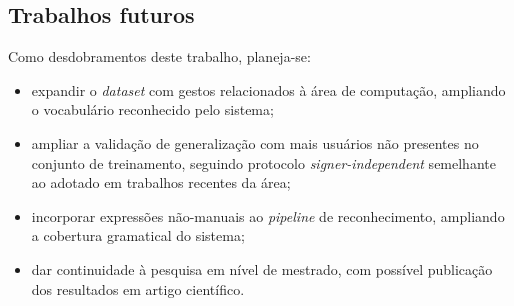 \subsection{Trabalhos futuros}
\label{subsec:futuros}

Como desdobramentos deste trabalho, planeja-se:

\begin{itemize}[leftmargin=2cm]
  \item expandir o \textit{dataset} com gestos relacionados à área de computação,
  ampliando o vocabulário reconhecido pelo sistema;
  \item ampliar a validação de generalização com mais usuários não presentes no
  conjunto de treinamento, seguindo protocolo \textit{signer-independent}
  semelhante ao adotado em trabalhos recentes da área;
  \item incorporar expressões não-manuais ao \textit{pipeline} de reconhecimento,
  ampliando a cobertura gramatical do sistema;
  \item dar continuidade à pesquisa em nível de mestrado, com possível publicação
  dos resultados em artigo científico.
\end{itemize}
